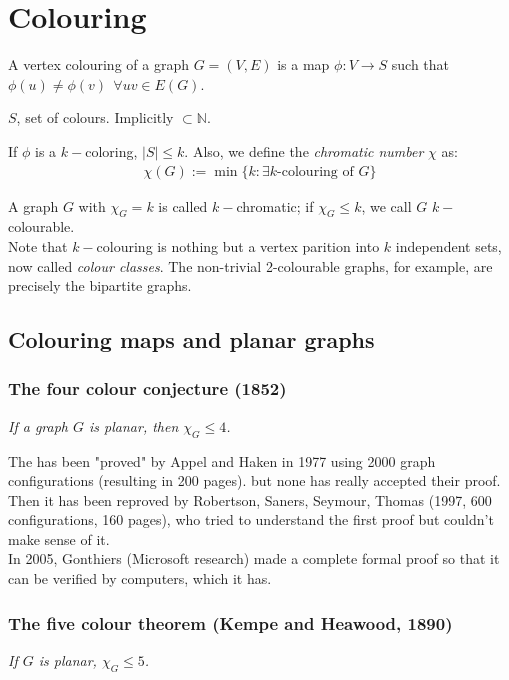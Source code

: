 
\chapter{Colouring}
A vertex colouring of a graph $G = (V,E)$ is a map $\phi: V \rightarrow S$ such that $\phi(u) \neq \phi(v) ~~\forall uv \in E(G)$.

$S$, set of colours. Implicitly $\subset \mathbb{N}$.

\bigskip
If $\phi$ is a $k-$coloring, $|S| \leq k$. Also, we define the \textit{chromatic number} $\chi$ as:
\begin{eqnarray}
	\chi (G) := \min \{ k : \exists k\text{-colouring of }G \}
\end{eqnarray}

A graph $G$ with $\chi_{G} = k$ is called $k-$chromatic; if $\chi_{G} \leq k$, we call $G$ $k-$colourable.\\

Note that $k-$colouring is nothing but a vertex parition into $k$ independent sets, now called \textit{colour classes}. The non-trivial 2-colourable graphs, for example, are precisely the bipartite graphs.

	\section{Colouring maps and planar graphs}
		\subsection{The four colour conjecture (1852)}
		\textit{If a graph $G$ is planar, then $\chi_{G} \leq 4$.	\\}
		
		The has been "proved" by Appel and Haken in 1977 using 2000 graph configurations (resulting in 200 pages). but none has really accepted their proof. \\
		
		Then it has been reproved by Robertson, Saners, Seymour, Thomas (1997, 600 configurations, 160 pages), who tried to understand the first proof but couldn't make sense of it. \\
		
		In 2005, Gonthiers (Microsoft research) made a complete formal proof so that it can be verified by computers, which it has.
		
		\subsection{The five colour theorem (Kempe and Heawood, 1890)}
		\textit{If $G$ is planar, $\chi_{G} \leq 5$.\\}
		
